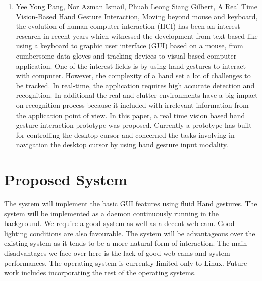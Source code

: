 \documentclass[11pt]{report}
\begin{document}
\begin{enumerate}
    \item Yee Yong Pang, Nor Azman Ismail, Phuah Leong Siang Gilbert, A Real Time Vision-Based Hand Gesture Interaction, Moving  beyond  mouse  and  keyboard,  the  evolution of human-computer interaction (HCI) has been an interest research in recent years which witnessed the development from text-based  like  using  a  keyboard  to  graphic  user  interface (GUI)  based  on  a  mouse,  from  cumbersome  data  gloves  and tracking devices to visual-based computer application. One of the  interest  fields  is  by  using  hand  gestures  to  interact  with computer.  However,  the  complexity  of  a  hand  set  a  lot  of challenges to be tracked. In real-time, the application requires high accurate detection and recognition. In additional the real and  clutter  environments  have  a  big  impact  on  recognition process  because  it  included  with  irrelevant  information  from the   application   point   of   view.   In   this   paper,   a   real   time vision based hand gesture interaction prototype was proposed. Currently  a  prototype  has  built  for  controlling  the  desktop cursor  and  concerned  the  tasks  involving  in  navigation  the desktop  cursor  by  using  hand  gesture  input  modality.

\end{enumerate}

\section{Proposed System}


The system will implement the basic GUI features using fluid Hand gestures. The system will be implemented as a daemon continuously running in the background. We require a good system as well as a decent web cam. Good lighting conditions are also favourable.
The system will be advantageous over the existing system as it tends to be a more natural form of interaction. 
The main disadvantages we face over here is the lack of good web cams and system performances. The operating system is currently limited only to Linux. Future work includes incorporating the rest of the operating systems. 
\end{document}
